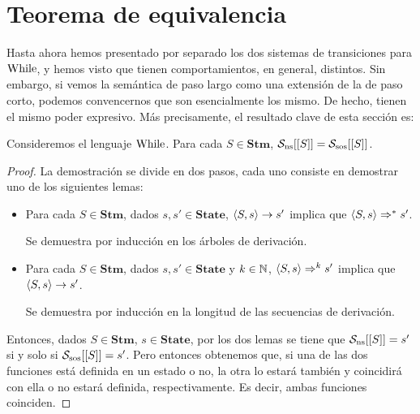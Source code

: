 \section{Teorema de equivalencia}

Hasta ahora hemos presentado por separado los dos sistemas de transiciones para $\mathrm{While}$, y hemos visto que tienen comportamientos, en general, distintos. Sin embargo, si vemos la semántica de paso largo como una extensión de la de paso corto, podemos convencernos que son esencialmente los mismo. De hecho, tienen el mismo poder expresivo. Más precisamente, el resultado clave de esta sección es:

\begin{theorem}
Consideremos el lenguaje $\mathrm{While}$. Para cada $S \in \mathbf{Stm}$, $\mathcal{S}_{\mathrm{ns}}[[S]] = \mathcal{S}_{\mathrm{sos}}[[S]]$.
\end{theorem}
\begin{proof}
La demostración se divide en dos pasos, cada uno consiste en demostrar uno de los siguientes lemas:
\begin{itemize}
\item Para cada $S \in \mathbf{Stm}$, dados $s, s' \in \mathbf{State}$, $\langle S, s \rangle\rightarrow s'$ implica que $\langle S, s \rangle\Rightarrow^* s'$.

Se demuestra por inducción en los árboles de derivación.

\item Para cada $S \in \mathbf{Stm}$, dados $s, s' \in \mathbf{State}$ y $k \in \mathbb{N}$, $\langle S, s \rangle\Rightarrow^k s'$ implica que $\langle S, s \rangle\to s'$.

Se demuestra por inducción en la longitud de las secuencias de derivación.
\end{itemize}

Entonces, dados $S \in \mathbf{Stm}$, $s\in \mathbf{State}$, por los dos lemas se tiene que $\mathcal{S}_{\mathrm{ns}}[[S]] = s'$ si y solo si $\mathcal{S}_{\mathrm{sos}}[[S]] = s'$. Pero entonces obtenemos que, si una de las dos funciones está definida en un estado o no, la otra lo estará también y coincidirá con ella o no estará definida, respectivamente. Es decir, ambas funciones coinciden.
\end{proof}


